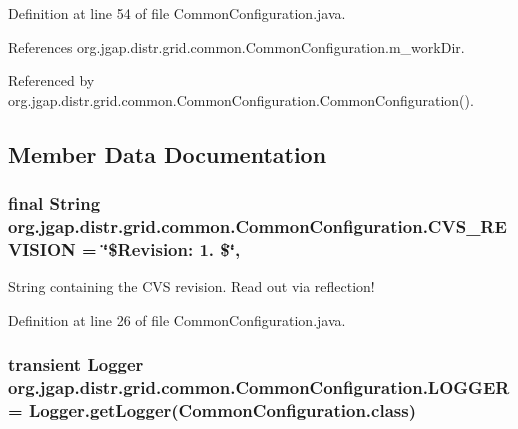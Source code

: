 Definition at line 54 of file Common\-Configuration.\-java.



References org.\-jgap.\-distr.\-grid.\-common.\-Common\-Configuration.\-m\-\_\-work\-Dir.



Referenced by org.\-jgap.\-distr.\-grid.\-common.\-Common\-Configuration.\-Common\-Configuration().



\subsection{Member Data Documentation}
\hypertarget{classorg_1_1jgap_1_1distr_1_1grid_1_1common_1_1_common_configuration_a8345afdfd08d1f301950ca02d7f68a57}{
\subsubsection[{C\-V\-S\-\_\-\-R\-E\-V\-I\-S\-I\-O\-N}]{\setlength{\rightskip}{0pt plus 5cm}final String org.\-jgap.\-distr.\-grid.\-common.\-Common\-Configuration.\-C\-V\-S\-\_\-\-R\-E\-V\-I\-S\-I\-O\-N = \char`\"{}\$Revision\-: 1. \$\char`\"{}\hspace{0.3cm}{\ttfamily [static]}, {\ttfamily [private]}}}\label{classorg_1_1jgap_1_1distr_1_1grid_1_1common_1_1_common_configuration_a8345afdfd08d1f301950ca02d7f68a57}
String containing the C\-V\-S revision. Read out via reflection! 

Definition at line 26 of file Common\-Configuration.\-java.

\hypertarget{classorg_1_1jgap_1_1distr_1_1grid_1_1common_1_1_common_configuration_a353a5f269cd3972691a1032825442712}{
\subsubsection[{L\-O\-G\-G\-E\-R}]{\setlength{\rightskip}{0pt plus 5cm}transient Logger org.\-jgap.\-distr.\-grid.\-common.\-Common\-Configuration.\-L\-O\-G\-G\-E\-R = Logger.\-get\-Logger(Common\-Configuration.\-class)\hspace{0.3cm}{\ttfamily [private]}}}\label{classorg_1_1jgap_1_1distr_1_1grid_1_1common_1_1_common_configuration_a353a5f269cd3972691a1032825442712}


